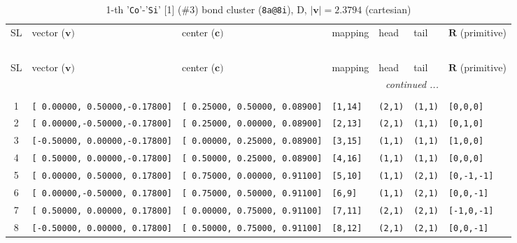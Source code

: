 \documentclass[fleqn,10pt,landscape]{jsarticle}
\begin{document}
\renewcommand{\arraystretch}{1.6}
\begin{longtable}[l]{cllllll}
\captionsetup{justification=raggedright, singlelinecheck=off}
\caption{1-th '\texttt{Co}'-'\texttt{Si}' [1] (\#3) bond cluster (\texttt{8a@8i}), D, $|\bm{v}|=2.3794$ (cartesian)}
 \\
 \hline \hline
SL & vector ($\bm{v})$ & center ($\bm{c})$ & mapping & head & tail & $\bm{R}$ (primitive) \\ \hline \endfirsthead

\multicolumn{6}{l}{\tablename\ \thetable{}} \\
 \hline \hline
SL & vector ($\bm{v})$ & center ($\bm{c})$ & mapping & head & tail & $\bm{R}$ (primitive) \\ \hline \endhead

 \hline \hline
\multicolumn{6}{r}{\footnotesize\it continued ...} \\ \endfoot

 \hline \hline
\multicolumn{6}{r}{} \\ \endlastfoot

1 & \texttt{[ 0.00000, 0.50000,-0.17800]} & \texttt{[ 0.25000, 0.50000, 0.08900]} & \texttt{[1,14]} & \texttt{(2,1)} & \texttt{(1,1)} & \texttt{[0,0,0]} \\ \hline
2 & \texttt{[ 0.00000,-0.50000,-0.17800]} & \texttt{[ 0.25000, 0.00000, 0.08900]} & \texttt{[2,13]} & \texttt{(2,1)} & \texttt{(1,1)} & \texttt{[0,1,0]} \\ \hline
3 & \texttt{[-0.50000, 0.00000,-0.17800]} & \texttt{[ 0.00000, 0.25000, 0.08900]} & \texttt{[3,15]} & \texttt{(1,1)} & \texttt{(1,1)} & \texttt{[1,0,0]} \\ \hline
4 & \texttt{[ 0.50000, 0.00000,-0.17800]} & \texttt{[ 0.50000, 0.25000, 0.08900]} & \texttt{[4,16]} & \texttt{(1,1)} & \texttt{(1,1)} & \texttt{[0,0,0]} \\ \hline
5 & \texttt{[ 0.00000, 0.50000, 0.17800]} & \texttt{[ 0.75000, 0.00000, 0.91100]} & \texttt{[5,10]} & \texttt{(1,1)} & \texttt{(2,1)} & \texttt{[0,-1,-1]} \\ \hline
6 & \texttt{[ 0.00000,-0.50000, 0.17800]} & \texttt{[ 0.75000, 0.50000, 0.91100]} & \texttt{[6,9]} & \texttt{(1,1)} & \texttt{(2,1)} & \texttt{[0,0,-1]} \\ \hline
7 & \texttt{[ 0.50000, 0.00000, 0.17800]} & \texttt{[ 0.00000, 0.75000, 0.91100]} & \texttt{[7,11]} & \texttt{(2,1)} & \texttt{(2,1)} & \texttt{[-1,0,-1]} \\ \hline
8 & \texttt{[-0.50000, 0.00000, 0.17800]} & \texttt{[ 0.50000, 0.75000, 0.91100]} & \texttt{[8,12]} & \texttt{(2,1)} & \texttt{(2,1)} & \texttt{[0,0,-1]} \\
\end{longtable}
\end{document}
